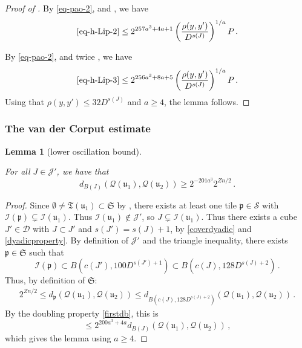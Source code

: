 \documentclass[10pt,a4paper]{article}
\theoremstyle{plain}
\newtheorem{lemma}[theorem]{Lemma}
\theoremstyle{definition}
\numberwithin{equation}{subsection}
\newcommand{\fp}{{\mathfrak p}}
\newcommand{\fu}{{\mathfrak u}}
\newcommand{\fT}{{\mathfrak T}}
\newcommand{\scI}{{\mathcal{I}}} %
\newcommand{\fcc}{{\mathcal{Q}}}
\newcommand{\lean}[1]{}
\newcommand{\uses}[1]{}
\newcommand{\leanok}{}
\begin{document}
\begin{proof}[Proof of ]
        By \eqref{eq-pao-2},  and , we have
        $$
            \eqref{eq-h-Lip-2} \le 2^{257a^3+4a+1} \left(\frac{\rho(y,y')}{D^{s(J)}}\right)^{1/a} P\,.
        $$

        By \eqref{eq-pao-2}, and twice , we have
        $$
            \eqref{eq-h-Lip-3} \le 2^{256a^3+8a+5} \left(\frac{\rho(y,y')}{D^{s(J)}}\right)^{1/a} P\,.
        $$
        Using that $\rho(y,y') \le 32D^{s(J)}$ and $a \ge 4$, the lemma follows.
    \end{proof}

\subsubsection{The van der Corput estimate}
\label{subsubsec-van-der-corput}
    \begin{lemma}[lower oscillation bound]
        \label{lower-oscillation-bound}
        \leanok
        \lean{TileStructure.Forest.lower_oscillation_bound}
        \uses{overlap-implies-distance}
        For all $J \in \mathcal{J}'$, we have that
        $$
            d_{B(J)}(\fcc(\fu_1), \fcc(\fu_2)) \ge 2^{-201a^3} 2^{Zn/2}\,.
        $$
    \end{lemma}

    \begin{proof}
    \leanok
    Since $\emptyset \ne \fT(\fu_1) \subset \mathfrak{S}$ by , there exists at least one tile $\fp \in \mathcal{S}$ with $\scI(\fp) \subsetneq \scI(\fu_1)$. Thus $\scI(\fu_1) \notin \mathcal{J}'$, so $J \subsetneq \scI(\fu_1)$. Thus there exists a cube $J' \in \mathcal{D}$ with $J \subset J'$ and $s(J') = s(J) + 1$, by \eqref{coverdyadic} and \eqref{dyadicproperty}. By definition of $\mathcal{J'}$ and the triangle inequality, there exists $\fp \in \mathfrak{S}$ such that
    $$
        \scI(\fp) \subset B(c(J'), 100 D^{s(J') + 1}) \subset B(c(J), 128 D^{s(J)+2})\,.
    $$
    Thus, by definition of $\mathfrak{S}$:
    \begin{align*}
        2^{Zn/2} \le d_{\fp}(\fcc(\fu_1), \fcc(\fu_2)) \le d_{B(c(J), 128 D^{s(J)+2})}(\fcc(\fu_1), \fcc(\fu_2))\,.
    \end{align*}
    By the doubling property \eqref{firstdb}, this is
    $$
        \le 2^{200a^3 + 4a} d_{B(J)}(\fcc(\fu_1), \fcc(\fu_2))\,,
    $$
    which gives the lemma using $a \ge 4$.
    \end{proof}
\end{document}
